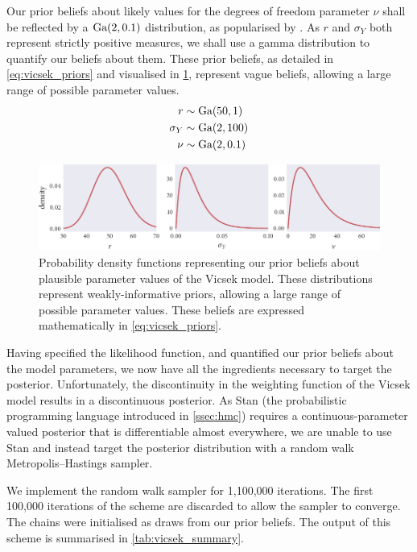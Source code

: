 Our prior beliefs about likely values for the degrees of freedom parameter
$\nu$ shall be reflected by a $\textrm{Ga}(2, 0.1)$ distribution, as popularised by
\textcite{juarez10}. As $r$ and $\sigma_Y$ both represent strictly positive
measures, we shall use a gamma distribution to quantify our beliefs about them.
These prior beliefs, as detailed in \cref{eq:vicsek_priors} and visualised in
\cref{fig:vicsek_priors}, represent vague beliefs, allowing a large range of
possible parameter values.
\begin{align}
  \label{eq:vicsek_priors}
  \begin{split}
    r           & \sim \textrm{Ga}(50, 1) \\
    \sigma_Y    & \sim \textrm{Ga}(2, 100)\\
    \nu         & \sim \textrm{Ga}(2, 0.1)
  \end{split}
\end{align}
\begin{figure}[tbp]
  \includegraphics{r_priors.pdf}
  \caption{Probability density functions representing our prior beliefs about
      plausible parameter values of the Vicsek model. These distributions
      represent weakly-informative priors, allowing a large range of possible
      parameter values. These beliefs are expressed mathematically in
  \cref{eq:vicsek_priors}.}
  \label{fig:vicsek_priors}
\end{figure}

Having specified the likelihood function, and quantified our prior beliefs
about the model parameters, we now have all the ingredients necessary to target
the posterior. Unfortunately, the discontinuity in the weighting function of
the Vicsek model results in a discontinuous posterior. As Stan (the
probabilistic programming language introduced in \cref{ssec:hmc}) requires a
continuous-parameter valued posterior that is differentiable almost everywhere,
we are unable to use Stan and instead target the posterior distribution with a
random walk Metropolis--Hastings sampler.

We implement the random walk sampler for 1,100,000 iterations. The first
100,000 iterations of the scheme are discarded to allow the sampler to
converge. The chains were initialised as draws from our prior beliefs. The
output of this scheme is summarised in
\cref{tab:vicsek_summary}.

